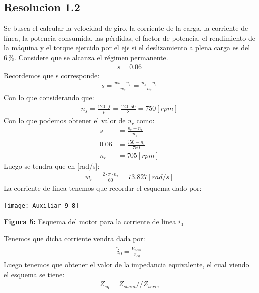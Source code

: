 \documentclass[
  11pt,
  letterpaper,
   addpoints,
   answers
  ]{exam}
\begin{document}
\begin{questions}
\begin{solution}
        \subsection*{Resolucion 1.2}
        Se busca el calcular la velocidad de giro, la corriente de la carga, la corriente de línea, la potencia consumida, las pérdidas, el factor de potencia, el rendimiento de la máquina y el torque ejercido por el eje si el deslizamiento a plena carga es del \(6 \, \%\). Considere que se alcanza el régimen permanente.
        \begin{align}
            s = 0.06 
        \end{align}
        Recordemos que s corresponde:
        \begin{align}
            s= \frac{w{s} - w_{r}}{w_{s}} = \frac{n_{s}- n_{r}}{n_{s}}
        \end{align}
        Con lo que considerando que:
        \begin{align}
            n_{s} = \frac{120 \cdot f}{p} = \frac{120 \cdot 50}{8} = 750[rpm]
        \end{align}
        Con lo que podemos obtener el valor de $n_{r}$ como:
        \begin{align}
            s&= \frac{n_{s} - n_{r}}{n_{s}}\\
            0.06 &= \frac{750- n_{r}}{750}\\
            n_{r} &= 705[rpm]
        \end{align}
        Luego se tendra que en [rad/s]:
        \begin{align}
            w_{r} = \frac{2 \cdot \pi \cdot n_{r}}{60} = 73.827[rad/s]
        \end{align}
        La corriente de linea tenemos que recordar el esquema dado por:
        \begin{center}
            \texttt{[image: Auxiliar\_9\_8]}
        \end{center}
        \begin{center}
            \textbf{Figura 5:} Esquema del motor para la corriente de linea $i_{0}$
        \end{center}
        Tenemos que dicha corriente vendra dada por:
        \begin{align}
            \hat{i}_{0} = \frac{\hat{V}_{nom}}{Z_{eq}}
        \end{align}
        Luego tenemos que obtener el valor de la impedancia equivalente, el cual viendo el esquema se tiene:
        \begin{align}
            Z_{eq} = Z_{shunt} // Z_{serie}

\end{align}
\end{solution}
\end{questions}
\end{document}
